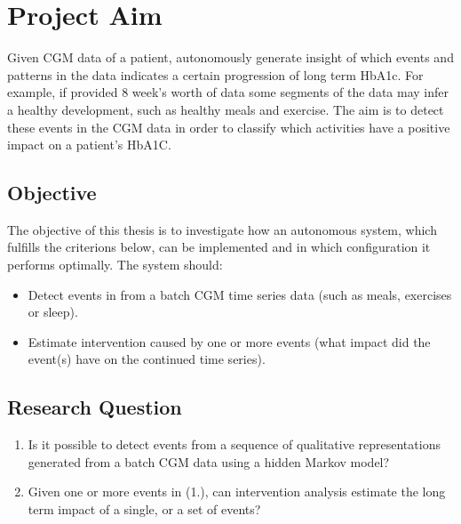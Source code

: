 \section{Project Aim}

Given CGM data of a patient, autonomously generate insight of which events and patterns in the data indicates a certain progression of long term HbA1c.
For example, if provided 8 week's worth of data some segments of the data may infer a healthy development, such as healthy meals and exercise.
The aim is to detect these events in the CGM data in order to classify which activities have a positive impact on a patient's HbA1C.

\subsection{Objective}

The objective of this thesis is to investigate how an autonomous system, which fulfills the criterions below, can be implemented and in which configuration it performs optimally. The system should:
\begin{itemize}
  \item Detect events in from a batch CGM time series data (such as meals, exercises or sleep).
  \item Estimate intervention caused by one or more events (what impact did the event(s) have on the continued time series).
\end{itemize}

\subsection{Research Question}

\begin{enumerate}
  \item Is it possible to detect events from a sequence of qualitative representations generated from a batch CGM data using a hidden Markov model?
  \item Given one or more events in (1.), can intervention analysis estimate the long term impact of a single, or a set of events?
\end{enumerate}
